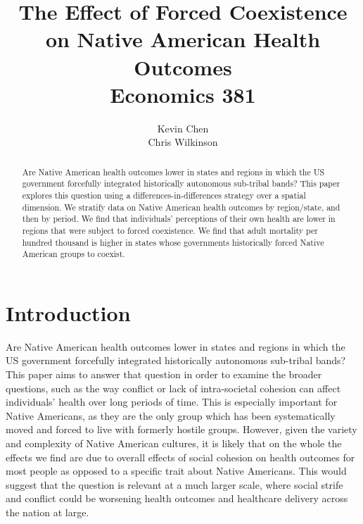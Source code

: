 \documentclass[12pt]{article}
\title{
The Effect of Forced Coexistence \\ on Native American Health Outcomes \\ 
{\small \sc Economics 381}
}
\author{Kevin Chen \\ Chris Wilkinson}
\begin{document}

\maketitle

\begin{abstract}
Are Native American health outcomes lower in states and regions in which the US government forcefully integrated historically autonomous sub-tribal bands? This paper explores this question using a differences-in-differences strategy over a spatial dimension. We stratify data on Native American health outcomes by region/state, and then by period. We find that individuals' perceptions of their own health are lower in regions that were subject to forced coexistence. We find that adult mortality per hundred thousand is higher in states whose governments historically forced Native American groups to coexist.
\end{abstract}

\newpage

\doublespacing

\section{Introduction}
Are Native American health outcomes lower in states and regions in which the US government forcefully integrated historically autonomous sub-tribal bands? 
This paper aims to answer that question in order to examine the broader questions, such as the way conflict or lack of intra-societal cohesion can affect individuals’ health over long periods of time.
This is especially important for Native Americans, as they are the only group which has been systematically moved and forced to live with formerly hostile groups.
However, given the variety and complexity of Native American cultures, it is likely that on the whole the effects we find are due to overall effects of social cohesion on health outcomes for most people as opposed to a specific trait about Native Americans.
This would suggest that the question is relevant at a much larger scale, where social strife and conflict could be worsening health outcomes and healthcare delivery across the nation at large.
\end{document}
